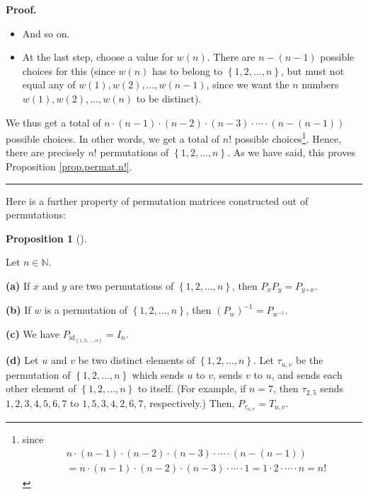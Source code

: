 \documentclass[numbers=enddot,12pt,final,onecolumn,notitlepage]{scrartcl}%
\theoremstyle{definition}
\newtheorem{prop}[theo]{Proposition}
\newenvironment{proposition}[1][]
{\begin{prop}[#1]\begin{leftbar}}
{\end{leftbar}\end{prop}}
\newenvironment{proof}[1][Proof]{\noindent\textbf{#1.} }{\ \rule{0.5em}{0.5em}}
\begin{document}
\begin{proof}
\begin{itemize}
\item And so on.

\item At the last step, choose a value for $w\left(  n\right)  $. There are
$n-\left(  n-1\right)  $ possible choices for this (since $w\left(  n\right)
$ has to belong to $\left\{  1,2,\ldots,n\right\}  $, but must not equal any
of $w\left(  1\right)  ,w\left(  2\right)  ,\ldots,w\left(  n-1\right)  $,
since we want the $n$ numbers $w\left(  1\right)  ,w\left(  2\right)
,\ldots,w\left(  n\right)  $ to be distinct).
\end{itemize}

We thus get a total of $n\cdot\left(  n-1\right)  \cdot\left(  n-2\right)
\cdot\left(  n-3\right)  \cdot\cdots\cdot\left(  n-\left(  n-1\right)
\right)  $ possible choices. In other words, we get a total of $n!$ possible
choices\footnote{since
\begin{align*}
&  n\cdot\left(  n-1\right)  \cdot\left(  n-2\right)  \cdot\left(  n-3\right)
\cdot\cdots\cdot\left(  n-\left(  n-1\right)  \right) \\
&  =n\cdot\left(  n-1\right)  \cdot\left(  n-2\right)  \cdot\left(
n-3\right)  \cdot\cdots\cdot1=1\cdot2\cdot\cdots\cdot n=n!
\end{align*}
}. Hence, there are precisely $n!$ permutations of $\left\{  1,2,\ldots
,n\right\}  $. As we have said, this proves Proposition \ref{prop.permat.n!}.
\end{proof}

Here is a further property of permutation matrices constructed out of permutations:

\begin{proposition}
\label{prop.permat.prod-of-perms}Let $n\in\mathbb{N}$.

\textbf{(a)} If $x$ and $y$ are two permutations of $\left\{  1,2,\ldots
,n\right\}  $, then $P_{x}P_{y}=P_{y\circ x}$.

\textbf{(b)} If $w$ is a permutation of $\left\{  1,2,\ldots,n\right\}  $,
then $\left(  P_{w}\right)  ^{-1}=P_{w^{-1}}$.

\textbf{(c)} We have $P_{\operatorname*{id}\nolimits_{\left\{  1,2,\ldots
,n\right\}  }}=I_{n}$.

\textbf{(d)} Let $u$ and $v$ be two distinct elements of $\left\{
1,2,\ldots,n\right\}  $. Let $\tau_{u,v}$ be the permutation of $\left\{
1,2,\ldots,n\right\}  $ which sends $u$ to $v$, sends $v$ to $u$, and sends
each other element of $\left\{  1,2,\ldots,n\right\}  $ to itself. (For
example, if $n=7$, then $\tau_{2,5}$ sends $1,2,3,4,5,6,7$ to $1,5,3,4,2,6,7$,
respectively.) Then, $P_{\tau_{u,v}}=T_{u,v}$.
\end{proposition}
\end{document}
